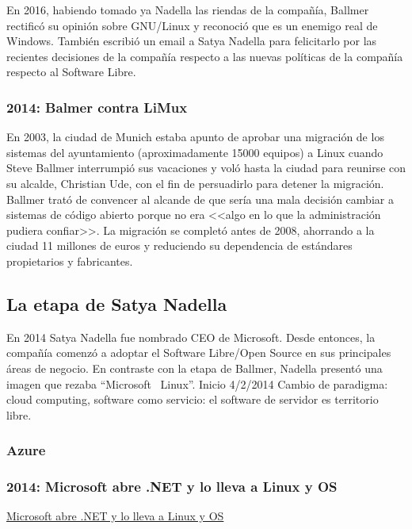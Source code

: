 En 2016, habiendo tomado ya Nadella las riendas de la compañía, Ballmer rectificó su opinión sobre GNU/Linux y reconoció que es un enemigo real de Windows. También escribió un email a Satya Nadella para felicitarlo por las recientes decisiones de la compañía respecto a las nuevas políticas de la compañía respecto al Software Libre.\cite{tung_2016:ballmer_linux_no_more_cancer}

\subsubsection{2014: Balmer contra LiMux}
En 2003, la ciudad de Munich estaba apunto de aprobar una migración de los sistemas del ayuntamiento (aproximadamente 15000 equipos) a Linux cuando Steve Ballmer interrumpió sus vacaciones y voló hasta la ciudad para reunirse con su alcalde, Christian Ude, con el fin de persuadirlo para detener la migración. Ballmer trató de convencer al alcande de que sería una mala decisión cambiar a sistemas de código abierto porque no era <<algo en lo que la administración pudiera confiar>>. La migración se completó antes de 2008, ahorrando a la ciudad 11 millones de euros y reduciendo su dependencia de estándares propietarios y fabricantes.\cite{munich_linux_migration}

\subsection{La etapa de Satya Nadella}
En 2014 Satya Nadella fue nombrado CEO de Microsoft. Desde entonces, la compañía comenzó a adoptar el Software Libre/Open Source en sus principales áreas de negocio. En contraste con la etapa de Ballmer, Nadella presentó una imagen que rezaba ``Microsoft \heart\ Linux''. 
Inicio 4/2/2014
Cambio de paradigma: cloud computing, software como servicio: el software de servidor es territorio libre.

\subsubsection{Azure}

\subsubsection{2014: Microsoft abre .NET y lo lleva a Linux y OS}
\href{https://arstechnica.com/information-technology/2014/11/microsoft-open-sources-net-takes-it-to-linux-and-os-x/}{Microsoft abre .NET y lo lleva a Linux y OS}

